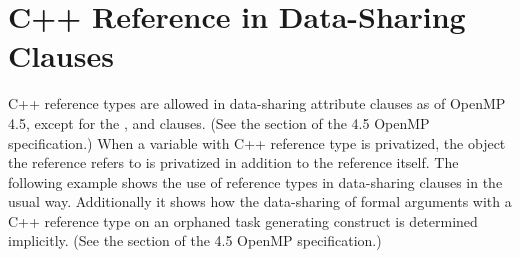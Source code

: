 \section{C++ Reference in Data-Sharing Clauses}
\cppspecificstart
\label{sec:cpp_reference}

C++ reference types are allowed in data-sharing attribute clauses as of OpenMP 4.5, except
for the ,  and  clauses.  
(See the  section of the 4.5 OpenMP specification.)
When a variable with C++ reference type is privatized, the object the reference refers to is privatized in addition to the reference itself.
The following example shows the use of reference types in data-sharing clauses in the usual way.
Additionally it shows how the data-sharing of formal arguments with a C++ reference type on an orphaned task generating construct is determined implicitly. (See the  section of the 4.5 OpenMP specification.)


\cppspecificend
